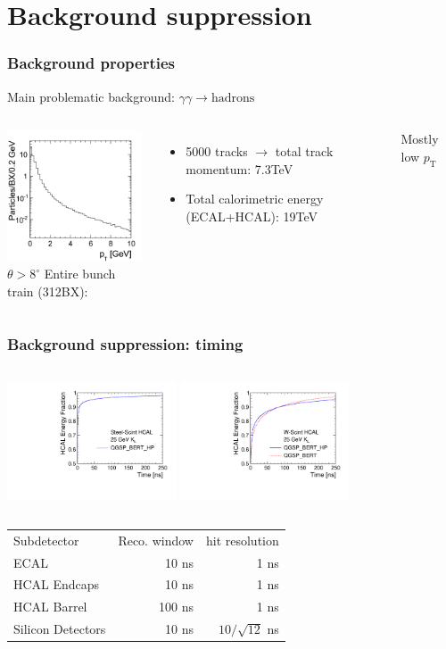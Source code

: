 \documentclass{beamer}
\begin{document}
\section[Bkg suppression]{Background suppression}
\begin{frame}
\frametitle{Background properties}
Main problematic background: $\gamma\gamma\to\textrm{hadrons}$
\begin{columns}[c]
\column{6cm}
\centering
\includegraphics[width=4cm]{ggPT}\\
$\theta>8^\circ$
\column{6cm}
Entire bunch train (312BX):
\begin{itemize}
  \item 5000 tracks $\to$ total track momentum: \alert{7.3TeV}
  \item Total calorimetric energy (ECAL+HCAL): \alert{19TeV}
\end{itemize}
Mostly low $p_{\textrm{T}}$
\end{columns}
\end{frame}
\begin{frame}
\frametitle{Background suppression: timing}
\begin{columns}[c]
\column{5cm}
\centering
\includegraphics[width=5cm]{hcalTimingSteel.pdf}
\column{5cm}
\centering
\includegraphics[width=5cm]{hcalTimingTungsten.pdf}
\end{columns}
\begin{center}
\begin{tabular}{lrr}
Subdetector &Reco. window &hit resolution\\
ECAL &10 ns &1 ns\\
HCAL Endcaps &10 ns &1 ns\\
HCAL Barrel &100 ns &1 ns\\
Silicon Detectors &10 ns &$10/\sqrt{12}$ ns
\end{tabular}
\end{center}
\end{frame}
\end{document}
